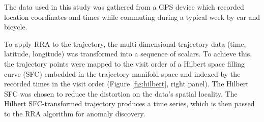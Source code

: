 \documentclass{sig-alternate}
\begin{document}
The data used in this study was gathered from a GPS device which recorded location coordinates and times while commuting during a typical week by car and bicycle. 

To apply RRA to the trajectory, the multi-dimensional trajectory data (time, latitude, longitude) was transformed into a sequence of scalars. To achieve this, the trajectory points were mapped to the visit order of a Hilbert space filling curve (SFC) \cite{hilbert} embedded in the trajectory manifold space and indexed by the recorded times in the visit order (Figure \ref{fig:hilbert}, right panel). The Hilbert SFC was chosen to reduce the distortion on the data's spatial locality. The Hilbert SFC-transformed trajectory produces a time series, which is then passed to the RRA algorithm for anomaly discovery.
\end{document}
